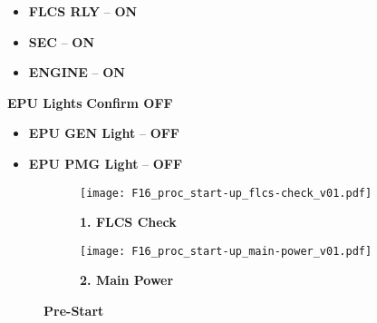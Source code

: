 \begin{tcolorenumerate}
{\begin{subenumerate}
\begin{itemize}
            \item \textbf{FLCS RLY} -- \textbf{ON}
            \item \textbf{SEC} -- \textbf{ON}
            \item \textbf{ENGINE} -- \textbf{ON}
        \end{itemize}
        \item \textbf{EPU Lights} \dotfill \textbf{Confirm OFF}
        \begin{itemize}
            \item \textbf{EPU GEN Light} -- \textbf{OFF}
            \item \textbf{EPU PMG Light} -- \textbf{OFF}
        \end{itemize}
    \end{subenumerate}}
\end{tcolorenumerate}


\begin{figure}[h]
    \centering
    \begin{subfigure}[t]{0.45\linewidth}
        \centering
        \texttt{[image: F16\_proc\_start-up\_flcs-check\_v01.pdf]}
        \caption*{\textbf{1. FLCS Check}}
        \label{fig:proc:prestart:flcscheck}
    \end{subfigure}
    \begin{subfigure}[t]{0.45\linewidth}
        \centering
        \texttt{[image: F16\_proc\_start-up\_main-power\_v01.pdf]}
        \caption*{\textbf{2. Main Power}}
        \label{fig:proc:prestart:mainpower}
    \end{subfigure}
    \caption{\textbf{Pre-Start}}
    \label{fig:proc:prestart}
\end{figure}

\clearpage

